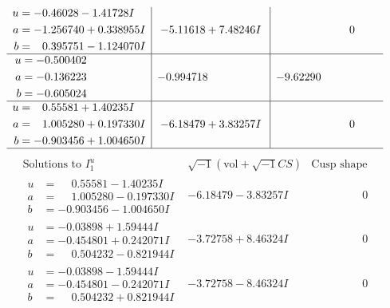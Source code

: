 \documentclass[1p]{elsarticle_modified}
\theoremstyle{definition}
\newcommand{\I}{\sqrt{-1}}
\begin{document}
$$\begin{array}{c|c|c}
\begin{aligned}
u &= -0.46028 - 1.41728 I \\
a &= -1.256740 + 0.338955 I \\
b &= \phantom{-}0.395751 - 1.124070 I\end{aligned}
 & -5.11618 + 7.48246 I & \phantom{-0.000000 } 0 \\ \hline\begin{aligned}
u &= -0.500402\phantom{ +0.000000I} \\
a &= -0.136223\phantom{ +0.000000I} \\
b &= -0.605024\phantom{ +0.000000I}\end{aligned}
 & -0.994718\phantom{ +0.000000I} & -9.62290\phantom{ +0.000000I} \\ \hline\begin{aligned}
u &= \phantom{-}0.55581 + 1.40235 I \\
a &= \phantom{-}1.005280 + 0.197330 I \\
b &= -0.903456 + 1.004650 I\end{aligned}
 & -6.18479 + 3.83257 I & \phantom{-0.000000 } 0\\
 \hline 
 \end{array}$$\newpage$$\begin{array}{c|c|c}  
\text{Solutions to }I^u_{1}& \I (\text{vol} + \sqrt{-1}CS) & \text{Cusp shape}\\
 \hline 
\begin{aligned}
u &= \phantom{-}0.55581 - 1.40235 I \\
a &= \phantom{-}1.005280 - 0.197330 I \\
b &= -0.903456 - 1.004650 I\end{aligned}
 & -6.18479 - 3.83257 I & \phantom{-0.000000 } 0 \\ \hline\begin{aligned}
u &= -0.03898 + 1.59444 I \\
a &= -0.454801 + 0.242071 I \\
b &= \phantom{-}0.504232 - 0.821944 I\end{aligned}
 & -3.72758 + 8.46324 I & \phantom{-0.000000 } 0 \\ \hline\begin{aligned}
u &= -0.03898 - 1.59444 I \\
a &= -0.454801 - 0.242071 I \\
b &= \phantom{-}0.504232 + 0.821944 I\end{aligned}
 & -3.72758 - 8.46324 I & \phantom{-0.000000 } 0 \\ \hline\begin{aligned}

\end{aligned}
\end{array}$$
\end{document}
